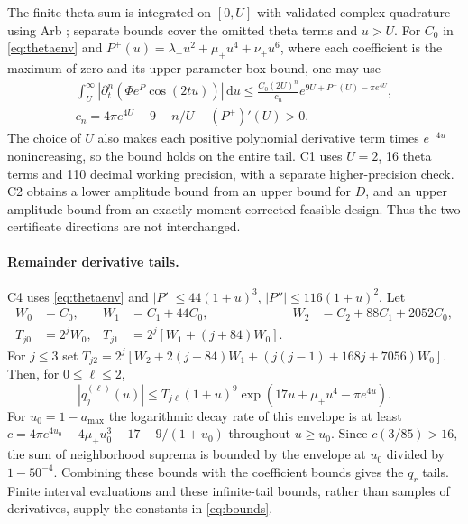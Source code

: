 \documentclass[11pt,a4paper]{article}
\numberwithin{equation}{section}
\theoremstyle{remark}\newtheorem{remark}[theorem]{Remark}
\newcommand{\dd}{\,\mathrm du}
\begin{document}
The finite theta sum is integrated on $[0,U]$ with validated complex
quadrature using Arb \cite{johansson,johanssonintegration}; separate bounds
cover the omitted theta terms and $u>U$. For $C_0$ in
\eqref{eq:thetaenv} and $P^+(u)=\lambda_+u^2+\mu_+u^4+\nu_+u^6$, where
each coefficient is the maximum of zero and its upper parameter-box bound,
one may use
\begin{equation}
 \begin{gathered}
 \int_U^\infty |\partial_t^n(\Phi e^P\cos(2tu))|\dd
 \le\frac{C_0(2U)^n}{c_n}e^{9U+P^+(U)-\pi e^{4U}},\\
 c_n=4\pi e^{4U}-9-n/U-(P^+)'(U)>0.
 \end{gathered}
\end{equation}
The choice of $U$ also makes each positive polynomial derivative term
times $e^{-4u}$ nonincreasing, so the bound holds on the entire tail.
C1 uses $U=2$, 16 theta terms and 110 decimal working precision, with a
separate higher-precision check. C2 obtains a lower amplitude bound from
an upper bound for $D$, and an upper amplitude bound from an exactly
moment-corrected feasible design. Thus the two certificate directions
are not interchanged.

\paragraph{Remainder derivative tails.}
C4 uses \eqref{eq:thetaenv} and $|P'|\le44(1+u)^3$,
$|P''|\le116(1+u)^2$. Let
\begin{align}
 W_0&=C_0,& W_1&=C_1+44C_0,& W_2&=C_2+88C_1+2052C_0,\\
 T_{j0}&=2^jW_0,& T_{j1}&=2^j[W_1+(j+84)W_0].
\end{align}
For $j\le3$ set
$T_{j2}=2^j[W_2+2(j+84)W_1+(j(j-1)+168j+7056)W_0]$.
Then, for $0\le\ell\le2$,
\begin{equation}
 |q_j^{(\ell)}(u)|\le T_{j\ell}(1+u)^9
 \exp(17u+\mu_+u^4-\pi e^{4u}).
\end{equation}
For $u_0=1-a_{\max}$ the logarithmic decay rate of this envelope is at
least $c=4\pi e^{4u_0}-4\mu_+u_0^3-17-9/(1+u_0)$ throughout $u\ge u_0$.
Since $c(3/85)>16$, the sum of neighborhood suprema is bounded by the
envelope at $u_0$ divided by $1-50^{-4}$. Combining these bounds with the
coefficient bounds gives the $q_r$ tails. Finite interval evaluations
and these infinite-tail bounds, rather than samples of derivatives,
supply the constants in \eqref{eq:bounds}.
\end{document}
